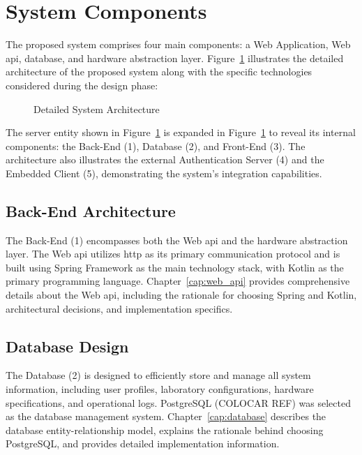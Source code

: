 \section{System Components}\label{sec:system_components}
The proposed system comprises four main components: a Web Application, Web \ac{api}, database, and hardware abstraction layer. Figure~\ref{fig:detailed_architecture} illustrates the detailed architecture of the proposed system along with the specific technologies considered during the design phase:

\begin{figure}[H]
    \centering
    
\caption{Detailed System Architecture}
\label{fig:detailed_architecture}
\end{figure}

The server entity shown in Figure~\ref{fig:detailed_architecture} is expanded in Figure~\ref{fig:detailed_architecture} to reveal its internal components: the Back-End (1), Database (2), and Front-End (3). The architecture also illustrates the external Authentication Server (4) and the Embedded Client (5), demonstrating the system's integration capabilities.

\subsection*{Back-End Architecture}
The Back-End (1) encompasses both the Web \ac{api} and the hardware abstraction layer. The Web \ac{api} utilizes \ac{http} as its primary communication protocol and is built using Spring Framework as the main technology stack, with Kotlin as the primary programming language. Chapter~\ref{cap:web_api} provides comprehensive details about the Web \ac{api}, including the rationale for choosing Spring and Kotlin, architectural decisions, and implementation specifics.

\subsection*{Database Design}
The Database (2) is designed to efficiently store and manage all system information, including user profiles, laboratory configurations, hardware specifications, and operational logs. PostgreSQL (COLOCAR REF) was selected as the database management system. Chapter~\ref{cap:database} describes the database entity-relationship model, explains the rationale behind choosing PostgreSQL, and provides detailed implementation information.

